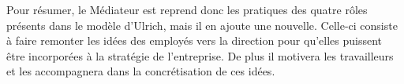 Pour résumer, le \og{}Médiateur\fg{} est reprend donc les pratiques des quatre rôles présents dans le modèle d'Ulrich, mais il en ajoute une nouvelle. Celle-ci consiste à faire remonter les idées des employés vers la direction pour qu'elles puissent être incorporées à la stratégie de l'entreprise. De plus il motivera les travailleurs et les accompagnera dans la concrétisation de ces idées. 